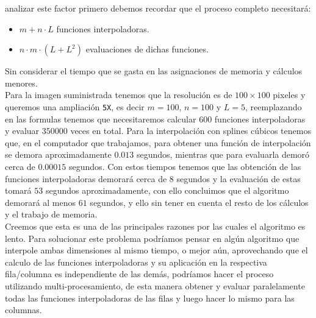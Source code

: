 \documentclass[spanish, fleqn]{article}
\begin{document}
\begin{enumerate}
			analizar este factor primero debemos recordar que el proceso
			completo necesitará:
			\begin{itemize}
				\item
					$m + n\cdot L$ funciones interpoladoras.
				\item
					$n\cdot m\cdot(L+L^{2})$ evaluaciones de dichas funciones.
			\end{itemize}
			Sin considerar el tiempo que se gasta en las asignaciones de memoria
			y cálculos menores.\\
			Para la imagen suministrada tenemos que la resolución es de
			$100\times 100$ pixeles y queremos una ampliación \texttt{5X}, es
			decir $m=100$, $n=100$ y $L=5$, reemplazando en las formulas
			tenemos que necesitaremos calcular $600$ funciones interpoladoras y
			evaluar $350000$ veces en total. Para la interpolación con splines
			cúbicos tenemos que, en el computador que trabajamos\footnotemark[1],
			para obtener una función de interpolación se demora aproximadamente
			$0.013$ segundos, mientras que para evaluarla demoró cerca de 
			$0.00015$ segundos. Con estos tiempos tenemos que las obtención de
			las funciones interpoladoras demorará cerca de $8$ segundos y la 
			evaluación de estas tomará $53$ segundos aproximadamente, con ello
			concluimos que el algoritmo demorará al menos $61$ segundos, y ello
			sin tener en cuenta el resto de los cálculos y el trabajo de
			memoria.\\
			Creemos que esta es una de las principales razones por las cuales el
			algoritmo es lento. Para solucionar este problema podríamos pensar
			en algún algoritmo que interpole ambas dimensiones al mismo tiempo,
			o mejor aún, aprovechando que el calculo de las funciones
			interpoladoras y su aplicación en la respectiva fila/columna es
			independiente de las demás, podríamos hacer el proceso utilizando
			multi-procesamiento, de esta manera obtener y evaluar paralelamente
			todas las funciones interpoladoras de las filas y luego hacer lo 
			mismo para las columnas.
	\end{enumerate}

\newpage 
\end{document}

